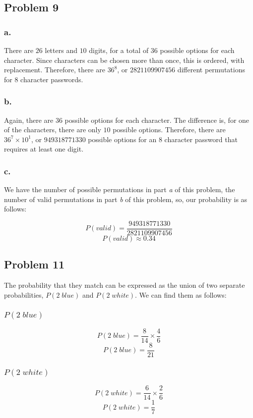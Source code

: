 \documentclass[11pt]{article}
\begin{document}
\subsection*{Problem 9}
\subsubsection*{a.}
There are $26$ letters and $10$ digits, for a total of $36$ possible
options for each character. Since characters can be chosen more than once,
this is ordered, with replacement. Therefore, there are $36^8$, or
$2821109907456$ different permutations for 8 character passwords. 

\subsubsection*{b.}
Again, there are $36$ possible options for each character. The difference is,
for one of the characters, there are only $10$ possible options. Therefore,
there are $36^7\times10^1$, or $949318771330$ possible options for an 8
character password that requires at least one digit.  

\subsubsection*{c.}
We have the number of possible permutations in part \textit{a} of this problem,
the number of valid permutations in part \textit{b} of this problem, so, our
probability is as follows:

\[P(valid) = \frac{949318771330}{2821109907456}\]
\[P(valid) \approx 0.34 \]

\subsection*{Problem 11}
The probability that they match can be expressed as the union of two separate
probabilities, $P(2\;blue)$ and $P(2\;white)$. We can find them as follows:

\subsubsection*{$P(2\;blue)$}
\[P(2\;blue) = \frac{8}{14} \times \frac{4}{6}\]
\[P(2\;blue) = \frac{8}{21}\]

\subsubsection*{$P(2\;white)$}
\[P(2\;white) = \frac{6}{14} \times \frac{2}{6}\]
\[P(2\;white) = \frac{1}{7}\]
\end{document}
